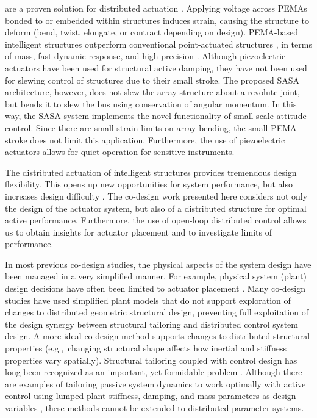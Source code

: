  \cite{Pan1992a, Hubbard1992a, Hwang1993a} are a proven solution for distributed actuation \cite{Alvarez-Salazar1999a, Bailey1985a}. Applying voltage across PEMAs bonded to or embedded within structures induces strain, causing the structure to deform (bend, twist, elongate, or contract depending on design). PEMA-based intelligent structures outperform conventional point-actuated structures \cite{Rao1994a, Dimitriadis1991a}, in terms of mass, fast dynamic response, and high precision \cite{Pinkerton1996a}. Although piezoelectric actuators have been used for structural active damping, they have not been used for slewing control of structures due to their small stroke. The proposed SASA architecture, however, does not slew the array structure about a revolute joint, but bends it to slew the bus using conservation of angular momentum. In this way, the SASA system implements the novel functionality of small-scale attitude control. Since there are small strain limits on array bending, the small PEMA stroke does not limit this application. Furthermore, the use of piezoelectric actuators allows for quiet operation for sensitive instruments.

The distributed actuation of intelligent structures provides tremendous design flexibility. This opens up new opportunities for system performance, but also increases design difficulty \cite{Pinkerton1996a, Fowler2012a}. The co-design work presented here considers not only the design of the actuator system, but also of a distributed structure for optimal active performance. Furthermore, the use of open-loop distributed control allows us to obtain insights for actuator placement and to investigate limits of performance.

In most previous co-design studies, the physical aspects of the system design have been managed in a very simplified manner. For example, physical system (plant) design decisions have often been limited to actuator placement \cite{Fanson1990a, Li2013a}. Many co-design studies have used simplified plant models \cite{Smith1992a, Dimitriadis1991a, Grandhi1989a, Allison2013d} that do not support exploration of changes to distributed geometric structural design, preventing full exploitation of the design synergy between structural tailoring and distributed control system design. A more ideal co-design method supports changes to distributed structural properties (e.g.,~changing structural shape affects how inertial and stiffness properties vary spatially). Structural tailoring coupled with control design has long been recognized as an important, yet formidable problem \cite{Belvin1990a}. Although there are examples of tailoring passive system dynamics to work optimally with active control using lumped plant stiffness, damping, and mass parameters as design variables \cite{Smith1992a}, these methods cannot be extended to distributed parameter systems.

